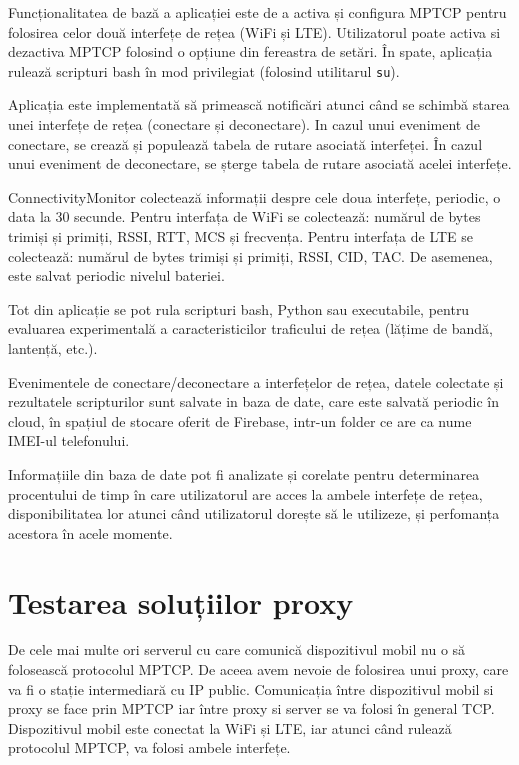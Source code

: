 Funcționalitatea de bază a aplicației este de a activa și configura MPTCP pentru folosirea celor două interfețe de rețea (WiFi și LTE). Utilizatorul poate activa si dezactiva MPTCP folosind o opțiune din fereastra de setări. În spate, aplicația rulează scripturi bash în mod privilegiat (folosind utilitarul \texttt{su}).

Aplicația este implementată să primească notificări atunci când se schimbă starea unei interfețe de rețea (conectare și deconectare). In cazul unui eveniment de conectare, se crează și populează tabela de rutare asociată interfeței. În cazul unui eveniment de deconectare, se șterge tabela de rutare asociată acelei interfețe.

ConnectivityMonitor colectează informații despre cele doua interfețe, periodic, o data la 30 secunde. Pentru interfața de WiFi se colectează: numărul de bytes trimiși și primiți, RSSI, RTT, MCS și frecvența. Pentru interfața de LTE se colectează: numărul de bytes trimiși și primiți, RSSI, CID, TAC. De asemenea, este salvat periodic nivelul bateriei. 

Tot din aplicație se pot rula scripturi bash, Python sau executabile, pentru evaluarea experimentală a caracteristicilor traficului de rețea (lățime de bandă, lantență, etc.).

Evenimentele de conectare/deconectare a interfețelor de rețea, datele colectate și rezultatele scripturilor sunt salvate in baza de date, care este salvată periodic în cloud, în spațiul de stocare oferit de Firebase, intr-un folder ce are ca nume IMEI-ul telefonului.

Informațiile din baza de date pot fi analizate și corelate pentru determinarea procentului de timp în care utilizatorul are acces la ambele interfețe de rețea, disponibilitatea lor atunci când utilizatorul dorește să le utilizeze, și perfomanța acestora în  acele momente.

\section{Testarea soluțiilor proxy}

De cele mai multe ori serverul cu care comunică dispozitivul mobil nu o să folosească protocolul MPTCP. De aceea avem nevoie de folosirea unui proxy, care va fi o stație intermediară cu IP public. Comunicația între dispozitivul mobil si proxy se face prin MPTCP iar între proxy si server se va folosi în general TCP. Dispozitivul mobil este conectat la WiFi și LTE, iar atunci când rulează protocolul MPTCP, va folosi ambele interfețe.

